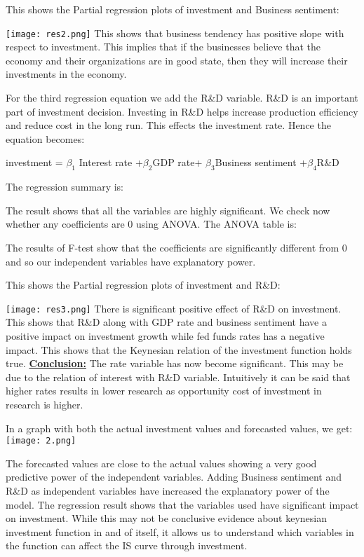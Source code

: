 \documentclass[12pt,a4paper,leqno]{report}
\theoremstyle{definition}
\begin{document}
This shows the Partial regression plots of investment and Business sentiment:

\texttt{[image: res2.png]}
This shows that business tendency has positive slope with respect to investment. This implies that if the businesses believe that the economy and their organizations are in good state, then they will increase their investments in the economy.  

For the third regression equation we add the R\&D variable. R\&D is an important part of investment decision. Investing in R\&D helps increase production efficiency and reduce cost in the long run. This effects the investment rate. Hence the equation becomes:
\begin{center}
	investment = $\beta_{1}$ Interest rate +$\beta_{2}$GDP rate+ $\beta_{3}$Business sentiment +$\beta_{4}$R\&D
\end{center}
The regression summary is:

The result shows that all the variables are highly significant. We check now whether any coefficients are 0 using ANOVA. The ANOVA table is:\newline



The results of F-test show that the coefficients are significantly different from 0 and so our independent variables have explanatory power.  
\newpage

This shows the Partial regression plots of investment and R\&D:

\texttt{[image: res3.png]}
There is significant positive effect of R\&D on investment. This shows that R\&D along with GDP rate and business sentiment have a positive impact on investment growth while fed funds rates has a negative impact. This shows that the Keynesian relation of the investment function holds true. 
\newpage
\textbf{\underline{Conclusion:}}\newline
The rate variable has now become significant. This may be due to the relation of interest with R\&D variable. Intuitively it can be said that higher rates results in lower research as opportunity cost of investment in  research is higher. 

In a graph with both the actual investment values and forecasted values, we get:\newline
\texttt{[image: 2.png]} 

The forecasted values are close to the actual values showing a very good predictive power of the independent variables. Adding Business sentiment and R\&D as independent variables have increased the explanatory power of the model. The regression result shows that the variables used have significant impact on investment. While this may not be conclusive evidence about keynesian investment function in and of itself, it allows us to understand which  variables in the function can affect the IS curve through investment.
\end{document}
